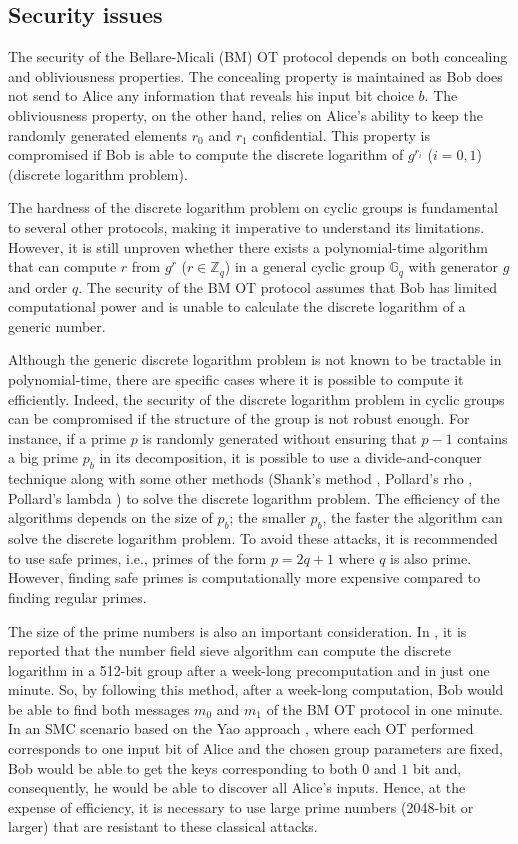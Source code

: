 \subsection{Security issues}

The security of the Bellare-Micali (BM) OT protocol depends on both concealing and obliviousness properties. The concealing property is maintained as Bob does not send to Alice any information that reveals his input bit choice $b$. The obliviousness property, on the other hand, relies on Alice's ability to keep the randomly generated elements $r_0$ and $r_1$ confidential. This property is compromised if Bob is able to compute the discrete logarithm of $g^{r_i}$ ($i=0,1$) (discrete logarithm problem).

The hardness of the discrete logarithm problem on cyclic groups is fundamental to several other protocols, making it imperative to understand its limitations. However, it is still unproven whether there exists a polynomial-time algorithm that can compute $r$ from $g^r$ ($r\in\mathbb{Z}_q$) in a general cyclic group $\mathbb{G}_q$ with generator $g$ and order $q$. The security of the BM OT protocol assumes that Bob has limited computational power and is unable to calculate the discrete logarithm of a generic number.

Although the generic discrete logarithm problem is not known to be tractable in polynomial-time, there are specific cases where it is possible to compute it efficiently. Indeed, the security of the discrete logarithm problem in cyclic groups can be compromised if the structure of the group is not robust enough. For instance, if a prime $p$ is randomly generated without ensuring that $p - 1$ contains a big prime $p_b$ in its decomposition, it is possible to use a divide-and-conquer technique \cite{PH78} along with some other methods (Shank's method \cite{S71}, Pollard's rho \cite{P78}, Pollard's lambda  \cite{P78}) to solve the discrete logarithm problem. The efficiency of the algorithms depends on the size of $p_b$; the smaller $p_b$, the faster the algorithm can solve the discrete logarithm problem. To avoid these attacks, it is recommended to use safe primes, i.e., primes of the form $p = 2q + 1$ where $q$ is also prime. However, finding safe primes is computationally more expensive compared to finding regular primes.
 
The size of the prime numbers is also an important consideration. In \cite{ABDGGHHSTVVWZZ15}, it is reported that the number field sieve algorithm can compute the discrete logarithm in a 512-bit group after a week-long precomputation and in just one minute. So, by following this method, after a week-long computation, Bob would be able to find both messages $m_0$ and $m_1$ of the BM OT protocol in one minute. In an SMC scenario based on the Yao approach \cite{Yao82}, where each OT performed corresponds to one input bit of Alice and the chosen group parameters are fixed, Bob would be able to get the keys corresponding to both $0$ and $1$ bit and, consequently, he would be able to discover all Alice's inputs. Hence, at the expense of efficiency, it is necessary to use large prime numbers (2048-bit or larger) that are resistant to these classical attacks.

